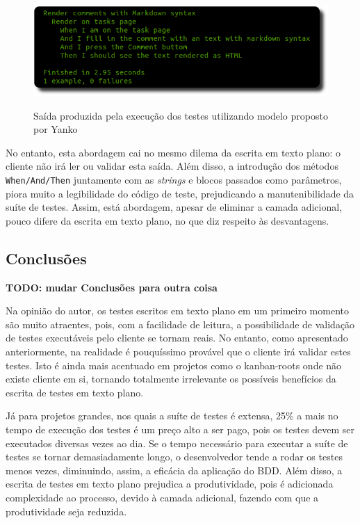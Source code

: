 \begin{figure}[h]
  \center
  \caption{Saída produzida pela execução dos testes utilizando modelo proposto por Yanko}
  \includegraphics[scale=0.6]{images/output-novo-modelo}
  \label{img:output-novo-modelo}
\end{figure}

No entanto, esta abordagem cai no mesmo dilema da escrita em texto plano: o cliente não irá ler ou validar esta saída. Além disso, a introdução dos métodos \texttt{When/And/Then} juntamente com as \textit{strings} e blocos passados como parâmetros, piora muito a legibilidade do código de teste, prejudicando a manutenibilidade da suíte de testes. Assim, está abordagem, apesar de eliminar a camada adicional, pouco difere da escrita em texto plano, no que diz respeito às desvantagens.


\subsection{Conclusões}
\label{sub:conclusoes_bdd}

\textbf{TODO: mudar Conclusões para outra coisa}

Na opinião do autor, os testes escritos em texto plano em um primeiro momento são muito atraentes, pois, com a facilidade de leitura, a possibilidade de validação de testes executáveis pelo cliente se tornam reais. No entanto, como apresentado anteriormente, na realidade é pouquíssimo provável que o cliente irá validar estes testes. Isto é ainda mais acentuado em projetos como o kanban-roots onde não existe cliente em si, tornando totalmente irrelevante os possíveis benefícios da escrita de testes em texto plano.

Já para projetos grandes, nos quais a suíte de testes é extensa, 25\% a mais no tempo de execução dos testes é um preço alto a ser pago, pois os testes devem ser executados diversas vezes ao dia. Se o tempo necessário para executar a suíte de testes se tornar demasiadamente longo, o desenvolvedor tende a rodar os testes menos vezes, diminuindo, assim, a eficácia da aplicação do BDD. Além disso, a escrita de testes em texto plano prejudica a produtividade, pois é adicionada complexidade ao processo, devido à camada adicional, fazendo com que a produtividade seja reduzida.

